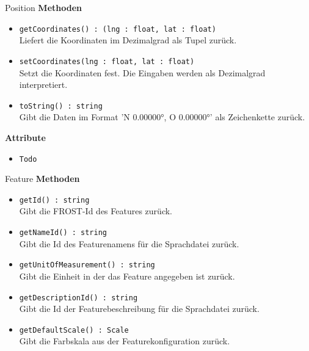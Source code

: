     \begin{Class}{Position}
        \textbf{Methoden}
        \begin{itemize}
            \item \texttt{getCoordinates() : (lng : float, lat : float)}
            \\ Liefert die Koordinaten im Dezimalgrad als Tupel zurück.
            \item \texttt{setCoordinates(lng : float, lat : float)}
            \\ Setzt die Koordinaten fest. Die Eingaben werden als Dezimalgrad interpretiert.

            \item \texttt{toString() : string}
            \\ Gibt die Daten im Format 'N 0.00000°, O 0.00000°' als Zeichenkette zurück.
        \end{itemize}
        
        \textbf{Attribute}
        \begin{itemize}
            \item \texttt{Todo}
        \end{itemize}
    \end{Class}

    \begin{Class}{Feature}
        \textbf{Methoden}
        \begin{itemize}
            \item \texttt{getId() : string}
            \\ Gibt die FROST-Id des Features zurück.
            \item \texttt{getNameId() : string}
            \\ Gibt die Id des Featurenamens für die Sprachdatei zurück.
            \item \texttt{getUnitOfMeasurement() : string}
            \\ Gibt die Einheit in der das Feature angegeben ist zurück.
            \item \texttt{getDescriptionId() : string}
            \\ Gibt die Id der Featurebeschreibung für die Sprachdatei zurück.
            \item \texttt{getDefaultScale() : Scale}
            \\ Gibt die Farbskala aus der Featurekonfiguration zurück.
        \end{itemize}
    \end{Class}

